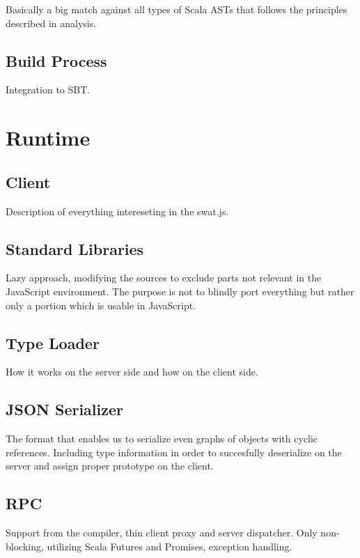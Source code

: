 \documentclass[12pt,a4paper]{report}
\begin{document}
Basically a big match against all types of Scala ASTs that follows the principles described in analysis.

\subsection{Build Process}

Integration to SBT.

\section{Runtime}

\subsection{Client}

Description of everything intereseting in the swat.js.

\subsection{Standard Libraries}

Lazy approach, modifying the sources to exclude parts not relevant in the JavaScript environment. The purpose is not to blindly port everything but rather only a portion which is usable in JavaScript.

\subsection{Type Loader}

How it works on the server side and how on the client side.

\subsection{JSON Serializer}

The format that enables us to serialize even graphs of objects with cyclic references. Including type information in order to succesfully deserialize on the server and assign proper prototype on the client.

\subsection{RPC}

Support from the compiler, thin client proxy and server dispatcher. Only non-blocking, utilizing Scala Futures and Promises, exception handling.
\end{document}
